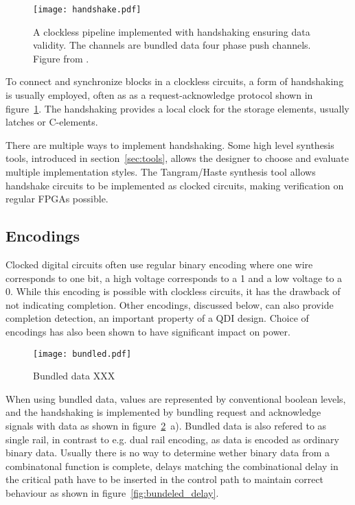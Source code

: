 \begin{figure}[htbp]
  \centering
  \texttt{[image: handshake.pdf]}
  \caption{A clockless pipeline implemented with handshaking ensuring
    data validity. The channels are bundled data four phase push
    channels. Figure from \cite{sparso}.}
  \label{fig:handshake}
\end{figure}

To connect and synchronize blocks in a clockless circuits, a form of
handshaking is usually employed, often as as a request-acknowledge
protocol shown in figure~\ref{fig:handshake}. The handshaking provides
a local clock for the storage elements, usually latches or C-elements.

There are multiple ways to implement handshaking. Some high level
synthesis tools, introduced in section~\ref{sec:tools}, allows the
designer to choose and evaluate multiple implementation styles. The
Tangram/Haste synthesis tool allows handshake circuits to be
implemented as clocked circuits, making verification on regular FPGAs
possible.

\subsection{Encodings}

Clocked digital circuits often use regular binary encoding where one
wire corresponds to one bit, a high voltage corresponds to a 1 and a
low voltage to a 0. While this encoding is possible with clockless
circuits, it has the drawback of not indicating completion. Other
encodings, discussed below, can also provide completion detection, an
important property of a QDI design. Choice of encodings has also been
shown to have significant impact on power.
 
\begin{figure}[htbp]
  \centering
  \texttt{[image: bundled.pdf]}
  \caption{Bundled data XXX}
  \label{fig:bundled}
\end{figure}

When using bundled data, values are represented by conventional
boolean levels, and the handshaking is implemented by bundling request
and acknowledge signals with data as shown in
figure~\ref{fig:bundled}~a). Bundled data is also refered to as
single rail, in contrast to e.g. dual rail encoding, as data is
encoded as ordinary binary data. Usually there is no way to determine
wether binary data from a combinatonal function is complete, delays
matching the combinational delay in the critical path have to be
inserted in the control path to maintain correct behaviour as shown in
figure~\ref{fig:bundeled_delay}.

